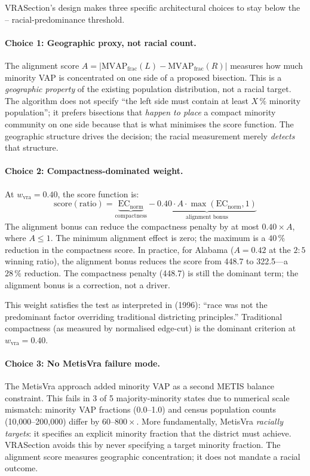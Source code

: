 VRASection's design makes three specific architectural choices to stay below
the \shaw{}--\miller{} racial-predominance threshold.

\paragraph{Choice 1: Geographic proxy, not racial count.}
The alignment score $A = |\text{MVAP}_\text{frac}(L) - \text{MVAP}_\text{frac}(R)|$
measures how much minority VAP is concentrated on one side of a proposed
bisection.
This is a \emph{geographic property} of the existing population distribution,
not a racial target.
The algorithm does not specify ``the left side must contain at least $X\,\%$
minority population''; it prefers bisections that \emph{happen to place} a
compact minority community on one side because that is what minimises the
score function.
The geographic structure drives the decision; the racial measurement merely
\emph{detects} that structure.

\paragraph{Choice 2: Compactness-dominated weight.}
At $w_\text{vra} = 0.40$, the score function is:
\[
  \text{score}(\text{ratio}) = \underbrace{\mathrm{EC}_\text{norm}}_{\text{compactness}} -
  \underbrace{0.40 \cdot A \cdot \max(\mathrm{EC}_\text{norm}, 1)}_{\text{alignment bonus}}
\]
The alignment bonus can reduce the compactness penalty by at most $0.40 \times A$,
where $A \leq 1$.
The minimum alignment effect is zero; the maximum is a $40\,\%$ reduction in
the compactness score.
In practice, for Alabama ($A = 0.42$ at the $2:5$ winning ratio), the alignment
bonus reduces the score from 448.7 to 322.5---a $28\,\%$ reduction.
The compactness penalty (448.7) is still the dominant term; the alignment bonus
is a correction, not a driver.

This weight satisfies the \miller{} test as interpreted in 
(1996): ``race was not the predominant factor overriding traditional districting
principles.''
Traditional compactness (as measured by normalised edge-cut) is the dominant
criterion at $w_\text{vra} = 0.40$.

\paragraph{Choice 3: No MetisVra failure mode.}
The MetisVra approach \citep{b3paper} added minority VAP as a second METIS
balance constraint.
This fails in 3 of 5 majority-minority states due to numerical scale mismatch:
minority VAP fractions (0.0--1.0) and census population counts (10,000--200,000)
differ by $60$--$800\times$.
More fundamentally, MetisVra \emph{racially targets}: it specifies an explicit
minority fraction that the district must achieve.
VRASection avoids this by never specifying a target minority fraction.
The alignment score measures geographic concentration; it does not mandate a
racial outcome.

